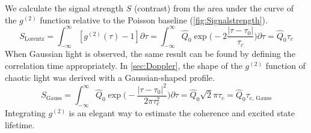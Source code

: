 We calculate the signal strength $S$ (contrast) from the area under the curve of the $g^{(2)}$ function relative to the Poisson baseline (\cref{fig:Signalstrength}).
\begin{equation}\label{eq:SignalstrengthLorentz}
	S_\mathrm{Lorentz}=\int_{-\infty}^\infty [g^{(2)}(\tau)-1]\partial\tau = \int_{-\infty}^\infty \hat{Q}_0\exp\Big(-2\dfrac{|\tau-\tau_0|}{\tau_c}\Big)\partial\tau =\hat{Q}_0\tau_c
\end{equation}
When Gaussian light is observed, the same result can be found by defining the correlation time appropriately. In \cref{sec:Doppler}, the shape of the $g^{(2)}$ function of chaotic light was derived with a Gaussian-shaped profile.
\begin{equation}\label{eq:SignalstrengthGauss}
	S_\mathrm{Gauss} =\int_{-\infty}^\infty \hat{Q}_0\exp\Big(-\dfrac{|\tau-\tau_0|^2}{2\pi \tau^2_c}\Big)\partial\tau =\hat{Q}_0\sqrt{2}\pi\tau_c=\hat{Q}_0\tau_\mathrm{c,\, Gauss}
\end{equation}
Integrating $g^{(2)}$ is an elegant way to estimate the coherence and excited state lifetime.

